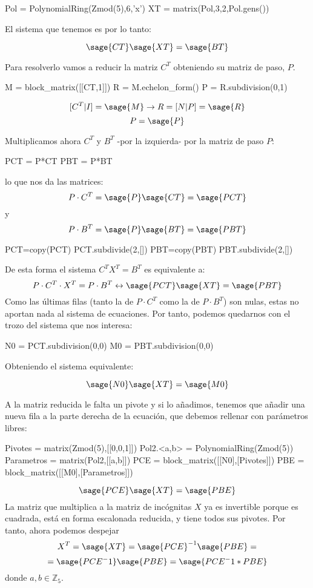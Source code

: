 \documentclass{amsart}
\begin{document}
\begin{sageblock}
Pol = PolynomialRing(Zmod(5),6,'x')
XT = matrix(Pol,3,2,Pol.gens())
\end{sageblock}

El sistema que tenemos es por lo tanto:

$$ \sage{CT} \sage{XT} = \sage{BT}$$

Para resolverlo vamos a reducir la matriz $C^T$ obteniendo su matriz de paso, $P$.

\begin{sageblock}
M = block_matrix([[CT,1]])
R = M.echelon_form()
P = R.subdivision(0,1)
\end{sageblock}
$$ [C^T|I]=\sage{M} \rightarrow R=[N|P]=\sage{R}$$
$$P=\sage{P}$$

Multiplicamos ahora $C^T$ y $B^T$ -por la izquierda- por la matriz de paso $P$:
\begin{sageblock}
PCT = P*CT
PBT = P*BT
\end{sageblock}
lo que nos da las matrices:
$$P\cdot C^T=\sage{P}\sage{CT}=\sage{PCT}$$
y
$$P\cdot B^T=\sage{P}\sage{BT}=\sage{PBT}$$

\begin{sageblock}
PCT=copy(PCT)
PCT.subdivide(2,[])
PBT=copy(PBT)
PBT.subdivide(2,[])
\end{sageblock}

De esta forma el sistema $C^TX^T=B^T$ es equivalente a:
$$ P\cdot C^T\cdot X^T= P\cdot B^T \leftrightarrow \sage{PCT} \sage{XT} = \sage{PBT} $$
Como las últimas filas (tanto la de  $P\cdot C^T$ como la de $P\cdot B^T$) son nulas, estas no aportan nada al sistema de ecuaciones. Por tanto, podemos quedarnos con el trozo del sistema que nos interesa:

\begin{sageblock}
N0 = PCT.subdivision(0,0)
M0 = PBT.subdivision(0,0)
\end{sageblock}

Obteniendo el sistema equivalente:

$$ \sage{N0} \sage{XT} = \sage{M0}  $$

A la matriz reducida le falta un pivote y si lo añadimos,  tenemos que añadir una nueva fila a la parte derecha de la ecuación, que debemos rellenar con parámetros libres:


\begin{sageblock}
Pivotes = matrix(Zmod(5),[[0,0,1]])
Pol2.<a,b> = PolynomialRing(Zmod(5))
Parametros = matrix(Pol2,[[a,b]])
PCE = block_matrix([[N0],[Pivotes]])
PBE = block_matrix([[M0],[Parametros]])
\end{sageblock}
$$ \sage{PCE} \sage{XT} = \sage{PBE} $$
 La matriz que multiplica a la matriz de incógnitas $X$ ya es invertible porque es cuadrada, está en forma escalonada reducida, y tiene todos sus pivotes. Por tanto, ahora podemos despejar
$$ X^T=\sage{XT} = {\sage{PCE}}^{-1} \sage{PBE} = $$
$$= \sage{PCE^-1}\sage{PBE}=\sage{PCE^-1 * PBE}$$
donde $a,b \in {\mathbb Z}_5$.
\end{document}
